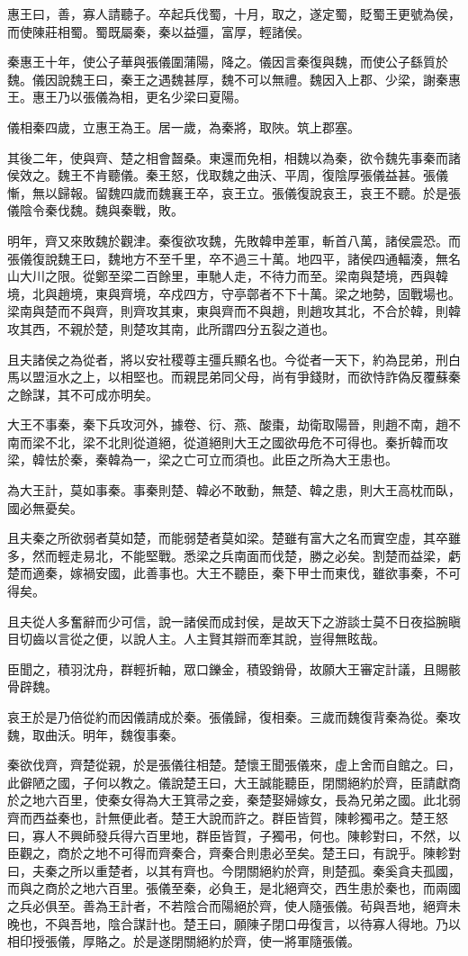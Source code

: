 惠王曰，善，寡人請聽子。卒起兵伐蜀，十月，取之，遂定蜀，貶蜀王更號為侯，而使陳莊相蜀。蜀既屬秦，秦以益彊，富厚，輕諸侯。

秦惠王十年，使公子華與張儀圍蒲陽，降之。儀因言秦復與魏，而使公子繇質於魏。儀因說魏王曰，秦王之遇魏甚厚，魏不可以無禮。魏因入上郡、少梁，謝秦惠王。惠王乃以張儀為相，更名少梁曰夏陽。

儀相秦四歲，立惠王為王。居一歲，為秦將，取陜。筑上郡塞。

其後二年，使與齊、楚之相會齧桑。東還而免相，相魏以為秦，欲令魏先事秦而諸侯效之。魏王不肯聽儀。秦王怒，伐取魏之曲沃、平周，復陰厚張儀益甚。張儀慚，無以歸報。留魏四歲而魏襄王卒，哀王立。張儀復說哀王，哀王不聽。於是張儀陰令秦伐魏。魏與秦戰，敗。

明年，齊又來敗魏於觀津。秦復欲攻魏，先敗韓申差軍，斬首八萬，諸侯震恐。而張儀復說魏王曰，魏地方不至千里，卒不過三十萬。地四平，諸侯四通輻湊，無名山大川之限。從鄭至梁二百餘里，車馳人走，不待力而至。梁南與楚境，西與韓境，北與趙境，東與齊境，卒戍四方，守亭鄣者不下十萬。梁之地勢，固戰場也。梁南與楚而不與齊，則齊攻其東，東與齊而不與趙，則趙攻其北，不合於韓，則韓攻其西，不親於楚，則楚攻其南，此所謂四分五裂之道也。

且夫諸侯之為從者，將以安社稷尊主彊兵顯名也。今從者一天下，約為昆弟，刑白馬以盟洹水之上，以相堅也。而親昆弟同父母，尚有爭錢財，而欲恃詐偽反覆蘇秦之餘謀，其不可成亦明矣。

大王不事秦，秦下兵攻河外，據卷、衍、燕、酸棗，劫衛取陽晉，則趙不南，趙不南而梁不北，梁不北則從道絕，從道絕則大王之國欲毋危不可得也。秦折韓而攻梁，韓怯於秦，秦韓為一，梁之亡可立而須也。此臣之所為大王患也。

為大王計，莫如事秦。事秦則楚、韓必不敢動，無楚、韓之患，則大王高枕而臥，國必無憂矣。

且夫秦之所欲弱者莫如楚，而能弱楚者莫如梁。楚雖有富大之名而實空虛，其卒雖多，然而輕走易北，不能堅戰。悉梁之兵南面而伐楚，勝之必矣。割楚而益梁，虧楚而適秦，嫁禍安國，此善事也。大王不聽臣，秦下甲士而東伐，雖欲事秦，不可得矣。

且夫從人多奮辭而少可信，說一諸侯而成封侯，是故天下之游談士莫不日夜搤腕瞋目切齒以言從之便，以說人主。人主賢其辯而牽其說，豈得無眩哉。

臣聞之，積羽沈舟，群輕折軸，眾口鑠金，積毀銷骨，故願大王審定計議，且賜骸骨辟魏。

哀王於是乃倍從約而因儀請成於秦。張儀歸，復相秦。三歲而魏復背秦為從。秦攻魏，取曲沃。明年，魏復事秦。

秦欲伐齊，齊楚從親，於是張儀往相楚。楚懷王聞張儀來，虛上舍而自館之。曰，此僻陋之國，子何以教之。儀說楚王曰，大王誠能聽臣，閉關絕約於齊，臣請獻商於之地六百里，使秦女得為大王箕帚之妾，秦楚娶婦嫁女，長為兄弟之國。此北弱齊而西益秦也，計無便此者。楚王大說而許之。群臣皆賀，陳軫獨弔之。楚王怒曰，寡人不興師發兵得六百里地，群臣皆賀，子獨弔，何也。陳軫對曰，不然，以臣觀之，商於之地不可得而齊秦合，齊秦合則患必至矣。楚王曰，有說乎。陳軫對曰，夫秦之所以重楚者，以其有齊也。今閉關絕約於齊，則楚孤。秦奚貪夫孤國，而與之商於之地六百里。張儀至秦，必負王，是北絕齊交，西生患於秦也，而兩國之兵必俱至。善為王計者，不若陰合而陽絕於齊，使人隨張儀。茍與吾地，絕齊未晚也，不與吾地，陰合謀計也。楚王曰，願陳子閉口毋復言，以待寡人得地。乃以相印授張儀，厚賂之。於是遂閉關絕約於齊，使一將軍隨張儀。

